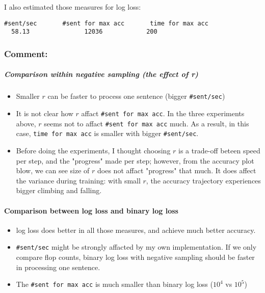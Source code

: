 \documentclass[11pt]{article}
\providecommand{\tightlist}{%
      \setlength{\itemsep}{0pt}\setlength{\parskip}{0pt}}
\begin{document}
I also estimated those measures for log loss:

\begin{verbatim}
#sent/sec       #sent for max acc       time for max acc
  58.13               12036            200
\end{verbatim}

\subsubsection{Comment:}\label{comment}

\subparagraph{Comparison within negative sampling (the effect of
r)}\label{comparison-within-negative-sampling-the-effect-of-r}

\begin{itemize}
\tightlist
\item
  Smaller \(r\) can be faster to process one sentence (bigger
  \texttt{\#sent/sec})
\item
  It is not clear how \(r\) affact \texttt{\#sent\ for\ max\ acc}. In
  the three experiments above, \(r\) seems not to affact
  \texttt{\#sent\ for\ max\ acc} much. As a result, in this case,
  \texttt{time\ for\ max\ acc} is smaller with bigger
  \texttt{\#sent/sec}.
\item
  Before doing the experiments, I thought choosing \(r\) is a trade-off
  beteen speed per step, and the "progress" made per step; however, from
  the accuracy plot blow, we can see size of \(r\) does not affact
  "progress" that much. It does affect the variance during training:
  with small \(r\), the accuracy trajectory experiences bigger climbing
  and falling.
\end{itemize}

\paragraph{Comparison between log loss and binary log
loss}\label{comparison-between-log-loss-and-binary-log-loss}

\begin{itemize}
\tightlist
\item
  log loss does better in all those measures, and achieve much better
  accuracy.
\item
  \texttt{\#sent/sec} might be strongly affacted by my own
  implementation. If we only compare flop counts, binary log loss with
  negative sampling should be faster in processing one sentence.
\item
  The \texttt{\#sent\ for\ max\ acc} is much smaller than binary log
  loss (\(10^4\) vs \(10^5\))
\end{itemize}
\end{document}
